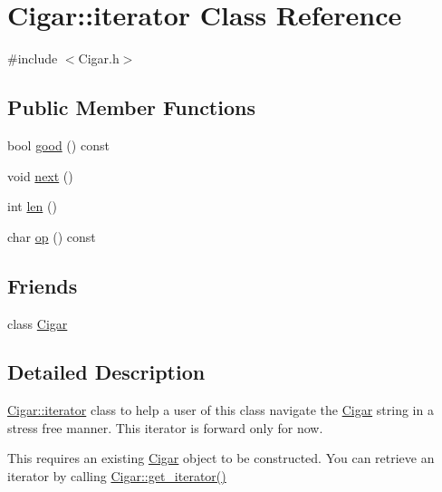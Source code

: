 \hypertarget{class_cigar_1_1iterator}{
\section{Cigar::iterator Class Reference}
\label{class_cigar_1_1iterator}
}


{\ttfamily \#include $<$Cigar.h$>$}

\subsection*{Public Member Functions}
\begin{DoxyCompactItemize}
\item 
bool \hyperlink{class_cigar_1_1iterator_a857df633570b08ddbf2b9f4184f48469}{good} () const 
\item 
void \hyperlink{class_cigar_1_1iterator_ac87966ff700c1cf3fdab49a3d3a807ca}{next} ()
\item 
int \hyperlink{class_cigar_1_1iterator_aba3d74e76b2ec3eed5e13db4e0f04112}{len} ()
\item 
char \hyperlink{class_cigar_1_1iterator_af106a13d303ec2f93343d959feaa6ca6}{op} () const 
\end{DoxyCompactItemize}
\subsection*{Friends}
\begin{DoxyCompactItemize}
\item 
\hypertarget{class_cigar_1_1iterator_a6bb77a766be10cfa66deca9a06c0f184}{
class \hyperlink{class_cigar_1_1iterator_a6bb77a766be10cfa66deca9a06c0f184}{Cigar}}
\label{class_cigar_1_1iterator_a6bb77a766be10cfa66deca9a06c0f184}

\end{DoxyCompactItemize}


\subsection{Detailed Description}
\hyperlink{class_cigar_1_1iterator}{Cigar::iterator} class to help a user of this class navigate the \hyperlink{class_cigar}{Cigar} string in a stress free manner. This iterator is forward only for now.

This requires an existing \hyperlink{class_cigar}{Cigar} object to be constructed. You can retrieve an iterator by calling \hyperlink{class_cigar_a3bb0c635eb4a28ae3c1985845bac06a5}{Cigar::get\_\-iterator()}

